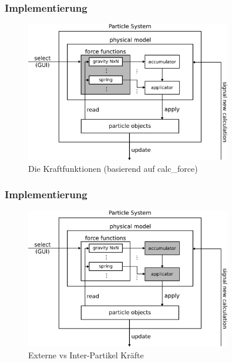 \documentclass{beamer}
\begin{document}
\begin{frame}
\frametitle{Implementierung}
\begin{figure}[]
\centering
\includegraphics[width=0.8\textwidth]{images/detail1.pdf}
\caption{Die Kraftfunktionen (basierend auf calc\_force)}
\end{figure}
\end{frame}

%

\begin{frame}
\frametitle{Implementierung}
\begin{figure}[]
\centering
\includegraphics[width=0.8\textwidth]{images/detail2.pdf}
\caption{Externe vs Inter-Partikel Kr\"afte}
\end{figure}
\end{frame}
\end{document}
